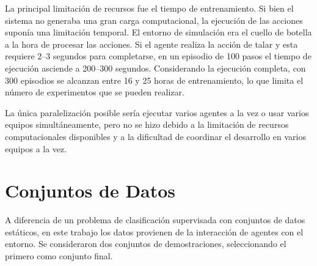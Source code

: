 \begin{table}[htbp]
  \centering
  \caption{Equipos empleados en el desarrollo del proyecto.}
  \label{tab:hardware}
\end{table}

La principal limitación de recursos fue el tiempo de entrenamiento. Si bien el
sistema no generaba una gran carga computacional, la ejecución de las acciones
suponía una limitación temporal. El entorno de simulación era el cuello de
botella a la hora de procesar las acciones. Si el agente realiza la acción de
talar y esta requiere \numrange{2}{3} segundos para completarse, en un episodio de \num{100}
pasos el tiempo de ejecución asciende a \numrange{200}{300} segundos. Considerando la ejecución
completa, con \num{300} episodios se alcanzan entre \num{16} y \num{25} horas de entrenamiento, lo
que limita el número de experimentos que se pueden realizar.

La única paralelización posible sería ejecutar varios agentes a la vez o usar
varios equipos simultáneamente, pero no se hizo debido a la limitación de recursos
computacionales disponibles y a la dificultad de coordinar el desarrollo en
varios equipos a la vez.

\section{Conjuntos de Datos}
A diferencia de un problema de clasificación supervisada con conjuntos de datos
estáticos, en este trabajo los datos provienen de la interacción de agentes con
el entorno. Se consideraron dos conjuntos de demostraciones, seleccionando el
primero como conjunto final.

